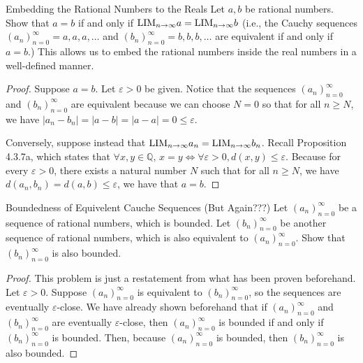 \begin{problem}{Embedding the Rational Numbers to the Reals}
Let $a, b$ be rational numbers.
Show that $a = b$ if and only if
$\text{LIM}_{n \to \infty} a = \text{LIM}_{n \to \infty} b$
(i.e., the Cauchy sequences $(a_n)_{n=0}^\infty = a, a, a, \dots$ and $(b_n)_{n=0}^\infty = b, b, b, \dots$ are equivalent if and only if $a = b$.)
This allows us to embed the rational numbers inside the real numbers in a well-defined manner.
\end{problem}
\begin{proof}
    Suppose $a = b$. 
    Let $\varepsilon > 0$ be given.
    Notice that the sequences $(a_n)_{n=0}^\infty$ and $(b_n)_{n=0}^\infty$ are equivalent 
    because we can choose $N=0$ so that for all $n \geq N$, we have $|a_n - b_n| = |a - b| = |a -a| = 0 \leq \varepsilon.$

    Conversely, suppose instead that $\text{LIM}_{n \to \infty} a_n = \text{LIM}_{n \to \infty} b_n$. 
    Recall Proposition 4.3.7a, which states that $\forall x, y \in \mathbb{Q}, \, x = y \iff \forall \varepsilon > 0, d(x, y) \leq \varepsilon$.
    Because for every $\varepsilon > 0$, there exists a natural number $N$ such that for all $n \geq N$, we have $d(a_n, b_n) = d(a, b) \leq \varepsilon$,
    we have that $a = b$.
\end{proof}

\begin{problem}{Boundedness of Equivelent Cauche Sequences (But Again???)}
Let $(a_n)_{n=0}^\infty$ be a sequence of rational numbers, which is bounded. 
Let $(b_n)_{n=0}^\infty$ be another sequence of rational numbers, 
which is also equivalent to $(a_n)_{n=0}^\infty$.
Show that $(b_n)_{n=0}^\infty$ is also bounded.
\end{problem}
\begin{proof}
    This problem is just a restatement from what has been proven beforehand.
    Let $\varepsilon > 0.$ 
    Suppose $(a_n)_{n=0}^\infty$ is equivalent to $(b_n)_{n=0}^\infty$, so the sequences are eventually $\varepsilon$-close.
    We have already shown beforehand that if $(a_n)_{n=0}^\infty$ and $( b_n)_{n=0}^\infty$ are eventually $\varepsilon$-close,
    then $(a_n)_{n=0}^\infty$ is bounded if and only if $(b_n)_{n=0}^\infty$ is bounded.
    Then, because $(a_n)_{n=0}^\infty$ is bounded, then $(b_n)_{n=0}^\infty$ is also bounded.
\end{proof}

